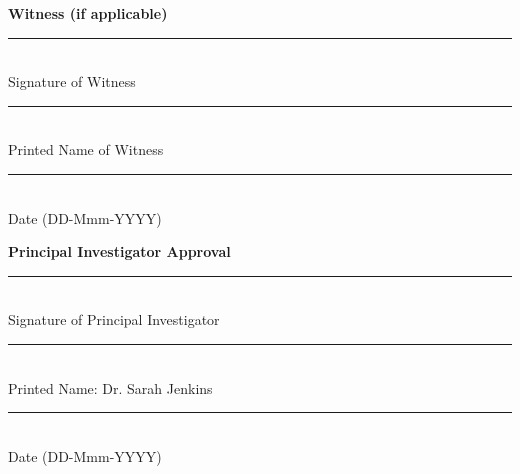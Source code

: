 \vspace{0.5cm}

\noindent
\begin{minipage}[t]{0.45\textwidth}
    \textbf{Witness (if applicable)} \\[1.0cm]
    \rule{\textwidth}{0.5pt} \\
    Signature of Witness \\[0.3cm]
    \rule{\textwidth}{0.5pt} \\
    Printed Name of Witness \\[0.3cm]
    \rule{\textwidth}{0.5pt} \\
    Date (DD-Mmm-YYYY)
\end{minipage}
\hfill
\begin{minipage}[t]{0.45\textwidth}
    \textbf{Principal Investigator Approval} \\[1.0cm]
    \rule{\textwidth}{0.5pt} \\
    Signature of Principal Investigator \\[0.3cm]
    \rule{\textwidth}{0.5pt} \\
    Printed Name: Dr. Sarah Jenkins \\[0.3cm]
    \rule{\textwidth}{0.5pt} \\
    Date (DD-Mmm-YYYY)
\end{minipage}
